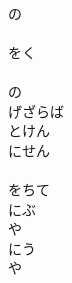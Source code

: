 \documentclass[10pt,b5j]{tarticle} %
\begin{document}
\begin{enumerate}
\begin{minipage}[c]{\blocksize}
        \vspace{\linespace}
        \item~\\
        の\\
        \\
        をく\\
        \\
        の\\
        げざらば\\
        とけん\\
        にせん\\
        \\
        をちて\\
        にぶ\\
        や\\
        にう\\
        や
    
    \end{minipage}
\end{enumerate} %
\end{document}

